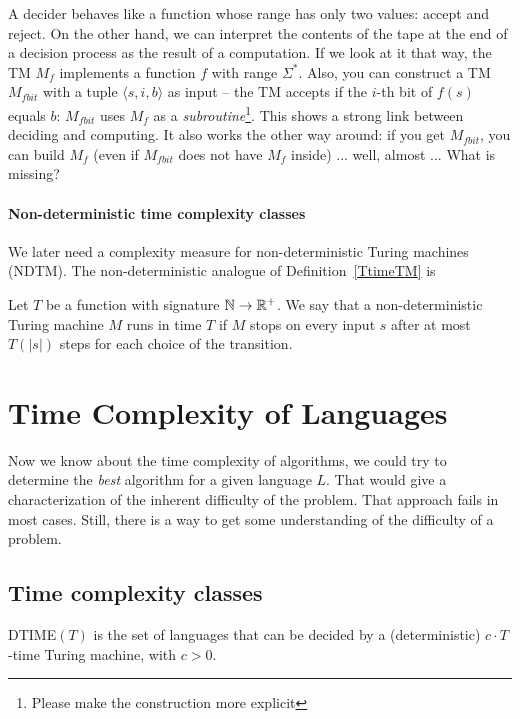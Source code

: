 A decider behaves like a function whose range has only two values:
accept and reject. On the other hand, we can interpret the contents
of the tape at the end of a decision process as the result of a
computation. If we look at it that way, the TM $M_f$ implements a
function $f$ with range $\Sigma^*$. Also, you can construct a TM $M_{fbit}$
with a tuple $\langle s,i,b \rangle$ as input -- the TM accepts if the
$i$-th bit of $f(s)$ equals $b$: $M_{fbit}$ uses $M_f$ as a {\em
subroutine}\footnote{Please make the construction more explicit}. This
shows a strong link between deciding and computing. It also works the
other way around: if you get $M_{fbit}$, you can build $M_f$ (even if
$M_{fbit}$ does not have $M_f$ inside) ... well, almost ... What is
missing?

\paragraph{Non-deterministic time complexity classes}
We later need a complexity measure for non-deterministic Turing
machines (NDTM). The non-deterministic analogue of
Definition~\ref{TtimeTM} is

\begin{definition} \label{TtimeNDTM}
Let $T$ be a function with
signature $\mathbb{N} \rightarrow \mathbb{R}^+$. We say that a non-deterministic
Turing machine $M$ runs in time $T$ if $M$ stops on every input $s$
after at most $T(|s|)$ steps for each choice of the transition.
\end{definition}


\section{Time Complexity of Languages}


Now we know about the time complexity of algorithms, we could try to
determine the {\em best} algorithm for a given language $L$. That
would give a characterization of the inherent difficulty of the
problem. That approach fails in most cases. Still, there is a way to
get some understanding of the difficulty of a problem.

\subsection{Time complexity classes}

\begin{definition}[DTIME$(T)$]
DTIME$(T)$ is the set of languages that can be decided by a
  (deterministic) $c \cdot T$-time Turing machine, with $c > 0$.
\end{definition}


